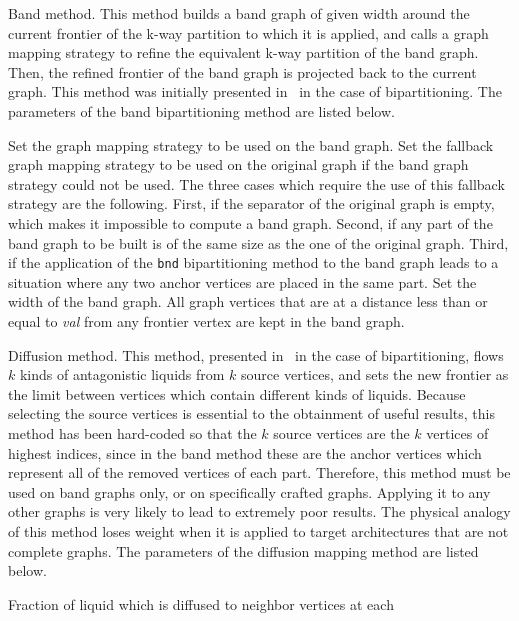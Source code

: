 \begin{itemize}
\iteme[{\tt b}]
Band method. This method builds a band graph of given width around the
current frontier of the k-way partition to which it is applied, and
calls a graph mapping strategy to refine the equivalent k-way
partition of the band graph. Then, the refined frontier of the band
graph is projected back to the current graph. This method was
initially presented in~\cite{chpe06a} in the case of bipartitioning.
The parameters of the band bipartitioning method are listed below.
\begin{itemize}
\iteme[{\tt bnd=}{\it strat}]
Set the graph mapping strategy to be used on the band graph.
\iteme[{\tt org=}{\it strat}]
Set the fallback graph mapping strategy to be used on the
original graph if the band graph strategy could not be used. The three
cases which require the use of this fallback strategy are the
following. First, if the separator of the original graph is empty,
which makes it impossible to compute a band graph. Second, if any part
of the band graph to be built is of the same size as the one of the
original graph. Third, if the application of the {\tt bnd}
bipartitioning method to the band graph leads to a situation where any
two anchor vertices are placed in the same part.
\iteme[{\tt width=}{\it val}]
Set the width of the band graph. All graph vertices that are at a
distance less than or equal to {\it val} from any frontier vertex
are kept in the band graph.
\end{itemize}
\iteme[{\tt d}]
Diffusion method. This method, presented in~\cite{pell07b} in the case
of bipartitioning, flows $k$ kinds of antagonistic liquids from $k$
source vertices, and sets the new frontier as the limit between vertices
which contain different kinds of liquids. Because
selecting the source vertices is essential to the obtainment of useful
results, this method has been hard-coded so that the $k$ source
vertices are the $k$ vertices of highest indices, since in the band
method these are the anchor vertices which represent all of the removed
vertices of each part. Therefore, this method must be used on band
graphs only, or on specifically crafted graphs. Applying it to any
other graphs is very likely to lead to extremely poor results.
The physical analogy of this method loses weight when it is applied to
target architectures that are not complete graphs.
The parameters of the diffusion mapping method are listed below.
\begin{itemize}
\iteme[{\tt dif=}{\it rat}]
Fraction of liquid which is diffused to neighbor vertices at each

\end{itemize}
\end{itemize}
